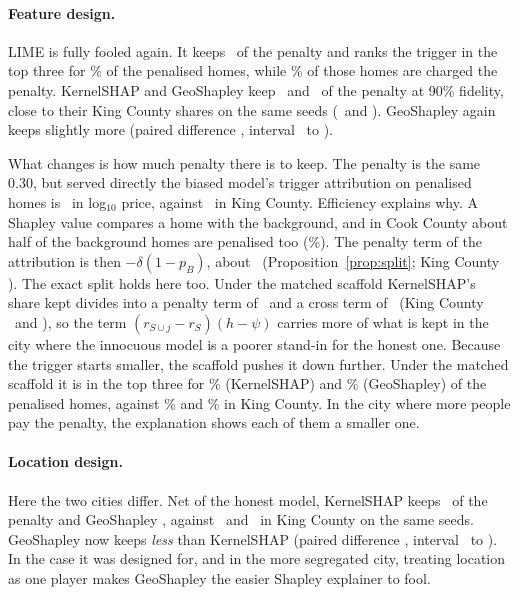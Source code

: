 \paragraph{Feature design.} LIME is fully fooled again. It keeps \CookFLIMEMatKept\ of the penalty and ranks the
trigger in the top three for \CookFLIMEMatTopPen\% of the penalised homes, while \CookFLIMEMatFidPen\% of those homes
are charged the penalty. KernelSHAP and GeoShapley keep \CookFKernelSHAPMatKept\ and \CookFGeoShapleyMatKept\ of the
penalty at 90\% fidelity, close to their King County shares on the same seeds (\FKernelSHAPMatKeptFive\ and
\FGeoShapleyMatKeptFive).
GeoShapley again keeps slightly more (paired difference \CookFGeoMinusKsKept, interval \CookFGeoMinusKsKeptLo\ to
\CookFGeoMinusKsKeptHi).

What changes is how much penalty there is to keep. The penalty is the same 0.30, but served directly the biased
model's trigger attribution on penalised homes is \CookFKernelSHAPBiasedSigned\ in log$_{10}$ price, against
\FKernelSHAPBiasedSignedFive\ in King County. Efficiency explains why. A Shapley value compares a home with the
background, and in Cook County about half of the background homes are penalised too (\CookFShareBgPen\%). The penalty
term of the attribution is then $-\delta(1 - p_B)$, about \CookFEffPred\ (Proposition~\ref{prop:split}; King County
\FEffPredFive). The exact split holds here too. Under the matched scaffold KernelSHAP's share kept divides into a
penalty term of \CookFSplitPen\ and a cross term of \CookFSplitCross\ (King County \FSplitPenFive\ and \FSplitCrossFive), so
the term $(r_{S\cup j} - r_S)(h - \psi)$ carries more of what is kept in the city where the innocuous model is a
poorer stand-in for the honest one. Because the trigger starts smaller, the scaffold pushes it down further. Under the matched scaffold it is in the top three for
\CookFKernelSHAPMatTopPen\% (KernelSHAP) and \CookFGeoShapleyMatTopPen\% (GeoShapley) of the penalised homes, against
\FKernelSHAPMatTopPenFive\% and \FGeoShapleyMatTopPenFive\% in King County. In the city where more people pay the penalty,
the explanation shows each of them a smaller one.

\paragraph{Location design.} Here the two cities differ. Net of the honest model, KernelSHAP keeps
\CookLKernelSHAPMatKept\ of the penalty and GeoShapley \CookLGeoShapleyMatKept, against \LKernelSHAPMatKeptFive\ and
\LGeoShapleyMatKeptFive\ in King County on the same seeds. GeoShapley now keeps \emph{less} than KernelSHAP (paired difference
\CookLGeoMinusKsKept, interval \CookLGeoMinusKsKeptLo\ to \CookLGeoMinusKsKeptHi). In the case it was designed for,
and in the more segregated city, treating location as one player makes GeoShapley the easier Shapley explainer to
fool.

